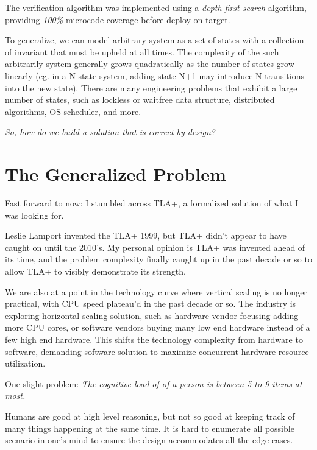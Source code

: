 The verification algorithm was implemented using a \textit{depth-first search}
algorithm, providing \textit{100\%} microcode coverage before deploy on
target.\newline

To generalize, we can model arbitrary system as a set of states with a
collection of invariant that must be upheld at all times. The complexity of the
such arbitrarily system generally grows quadratically as the number of states
grow linearly (eg. in a N state system, adding state N+1 may introduce N
transitions into the new state). There are many engineering problems that
exhibit a large number of states, such as lockless or waitfree data structure,
distributed algorithms, OS scheduler, and more.\newline

\textit{So, how do we build a solution that is correct by design?}

\section{The Generalized Problem}

Fast forward to now: I stumbled across TLA+, a formalized solution of what I was
looking for.\newline

Leslie Lamport invented the TLA+ 1999, but TLA+ didn't appear to have caught on
until the 2010's. My personal opinion is TLA+ was invented ahead of its time,
and the problem complexity finally caught up in the past decade or so to allow
TLA+ to visibly demonstrate its strength.\newline

We are also at a point in the technology curve where vertical scaling is no
longer practical, with CPU speed plateau'd in the past decade or so. The
industry is exploring horizontal scaling solution, such as hardware vendor
focusing adding more CPU cores, or software vendors buying many low end hardware
instead of a few high end hardware. This shifts the technology complexity from
hardware to software, demanding software solution to maximize concurrent
hardware resource utilization. \newline

One slight problem: \textit{The cognitive load of of a person is between 5 to 9
items at most.}\newline

Humans are good at high level reasoning, but not so good at keeping track of
many things happening at the same time. It is hard to enumerate all possible
scenario in one's mind to ensure the design accommodates all the edge cases.
\newline

